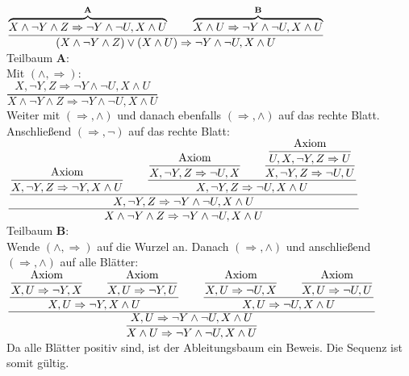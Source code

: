\documentclass[11pt, a4paper]{article}
\begin{document}
\begin{adjustwidth}{20pt}{20pt}
$
\dfrac
{\overbrace{X \wedge \neg Y \wedge Z \Rightarrow \neg Y \wedge \neg U, X \wedge U}^{\textbf{A}} \text{\qquad} \overbrace{X \wedge U\Rightarrow \neg Y \wedge \neg U, X \wedge U}^{\textbf{B}}}
{(X \wedge \neg Y \wedge Z)\vee(X \wedge U)\Rightarrow \neg Y \wedge \neg U, X \wedge U}
$\\

Teilbaum \textbf{A}:\\

Mit $(\wedge,\Rightarrow)$:\\

$
\dfrac
{X , \neg Y , Z \Rightarrow \neg Y \wedge \neg U, X \wedge U}
{X \wedge \neg Y \wedge Z \Rightarrow \neg Y \wedge \neg U, X \wedge U}
$\\

Weiter mit $(\Rightarrow, \wedge)$ und danach ebenfalls $(\Rightarrow, \wedge)$ auf das rechte Blatt. Anschließend $(\Rightarrow, \neg)$ auf das rechte Blatt:\\

$
\dfrac
{\dfrac
 {\dfrac{\text{Axiom}}{X , \neg Y , Z \Rightarrow \neg Y, X \wedge U} \text{\qquad} 
  \dfrac
  {\dfrac
  {\text{Axiom}}
  {X , \neg Y , Z \Rightarrow  \neg U, X}  \text{\qquad} 
   \dfrac
   {\dfrac
  {\text{Axiom}}
  {U, X , \neg Y , Z \Rightarrow U}}
   {X , \neg Y , Z \Rightarrow  \neg U, U}}
  {X , \neg Y , Z \Rightarrow  \neg U, X \wedge U}}
 {X , \neg Y , Z \Rightarrow \neg Y \wedge \neg U, X \wedge U}}
{X \wedge \neg Y \wedge Z \Rightarrow \neg Y \wedge \neg U, X \wedge U}
$\\

Teilbaum \textbf{B}:\\

Wende $(\wedge,\Rightarrow)$ auf die Wurzel an. Danach $(\Rightarrow, \wedge)$ und anschließend $(\Rightarrow, \wedge)$ auf alle Blätter:\\

$
\dfrac
{	\dfrac{ \dfrac
  {\text{Axiom}}
  {X , U \Rightarrow \neg Y , X} \text{\qquad} \dfrac
  {\text{Axiom}}
  {X , U \Rightarrow \neg Y , U}}
	{X , U \Rightarrow \neg Y , X \wedge U} \text{\qquad} 
	\dfrac{\dfrac
  {\text{Axiom}}
  {X , U \Rightarrow \neg U , X}\text{\qquad}\dfrac
  {\text{Axiom}}
  {X , U \Rightarrow \neg U , U}}
	{X , U \Rightarrow  \neg U, X \wedge U}}
{
\dfrac
{X , U\Rightarrow \neg Y \wedge \neg U, X \wedge U}
{X \wedge U\Rightarrow \neg Y \wedge \neg U, X \wedge U}
}
$\\

Da alle Blätter positiv sind, ist der Ableitungsbaum ein Beweis. Die Sequenz ist somit gültig.
\end{adjustwidth}
\end{document}
